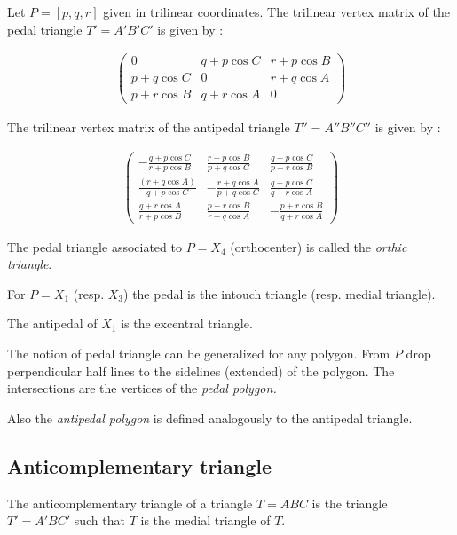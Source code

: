 Let $P=[p,q,r]$ given in trilinear coordinates. The trilinear vertex matrix of the pedal triangle $T'=A'B'C'$ is given by \cite{mw}:

\begin{align*}
   \left(\begin{matrix} 0& q+p\cos C& r+p\cos B\\
   p+q\cos C &0 & r+q\cos A\\
   p+r\cos B & q+r\cos A &0\end{matrix}\right)
\end{align*}


The trilinear vertex matrix of the antipedal triangle $T''=A''B''C''$ is given by \cite{mw}:
 
\begin{align*}
   \left(\begin{matrix} - \frac{ q + p \cos C}{r + p \cos B}& \frac{r + p \cos B}{p + q \cos C}& \frac{q + p \cos C}{p + r \cos B}\\
    \frac{ (r + q \cos A)}{q + p \cos C}& -\frac{r + q \cos A}{p + q \cos  C}& \frac{q + p \cos C}{q + r \cos A}\\
   \frac{q + r \cos A}{r + p \cos B}&\frac{ p + r \cos B}{r + q \cos A} & - \frac{p + r \cos B}{q + r \cos A}\end{matrix}\right)
\end{align*}

 The pedal triangle associated to  $P=X_4$ (orthocenter) is called the {\em orthic triangle}.
 
 For $P=X_1$ (resp. $X_3$) the pedal is the intouch triangle (resp. medial triangle). 
 
 The antipedal of $X_1$ is the excentral triangle.

The notion of pedal triangle  can be generalized for any polygon. From $P$ drop perpendicular half lines to the sidelines (extended) of the polygon. The intersections are the vertices of the {\em pedal polygon.}

Also the {\em  antipedal polygon} is defined analogously to the antipedal triangle.
 
 \subsection{ Anticomplementary triangle}
 
 The anticomplementary triangle of a triangle $T=ABC$ is the triangle $T'=A'BC'$ such that $T$ is the medial triangle of $T$.
 
